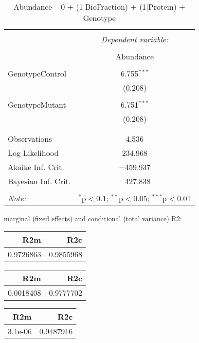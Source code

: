 \documentclass[11pt]{report}
\begin{document}
\begin{table}[!htbp] \centering 
  \caption{Abundance ~ 0 + (1|BioFraction) + (1|Protein) + Genotype} 
  \label{} 
\begin{tabular}{@{\extracolsep{5pt}}lc} 
\\[-1.8ex]\hline 
\hline \\[-1.8ex] 
 & \multicolumn{1}{c}{\textit{Dependent variable:}} \\ 
\cline{2-2} 
\\[-1.8ex] & Abundance \\ 
\hline \\[-1.8ex] 
 GenotypeControl & 6.755$^{***}$ \\ 
  & (0.208) \\ 
  & \\ 
 GenotypeMutant & 6.751$^{***}$ \\ 
  & (0.208) \\ 
  & \\ 
\hline \\[-1.8ex] 
Observations & 4,536 \\ 
Log Likelihood & 234.968 \\ 
Akaike Inf. Crit. & $-$459.937 \\ 
Bayesian Inf. Crit. & $-$427.838 \\ 
\hline 
\hline \\[-1.8ex] 
\textit{Note:}  & \multicolumn{1}{r}{$^{*}$p$<$0.1; $^{**}$p$<$0.05; $^{***}$p$<$0.01} \\ 
\end{tabular} 
\end{table} 
marginal (fixed effects) and conditional (total variance) R2:

\begin{tabular}{r|r}
\hline
R2m & R2c\\
\hline
0.9726863 & 0.9855968\\
\hline
\end{tabular}

\begin{tabular}{r|r}
\hline
R2m & R2c\\
\hline
0.0018408 & 0.9777702\\
\hline
\end{tabular}

\begin{tabular}{r|r}
\hline
R2m & R2c\\
\hline
3.1e-06 & 0.9487916\\
\hline
\end{tabular}
\end{document}
